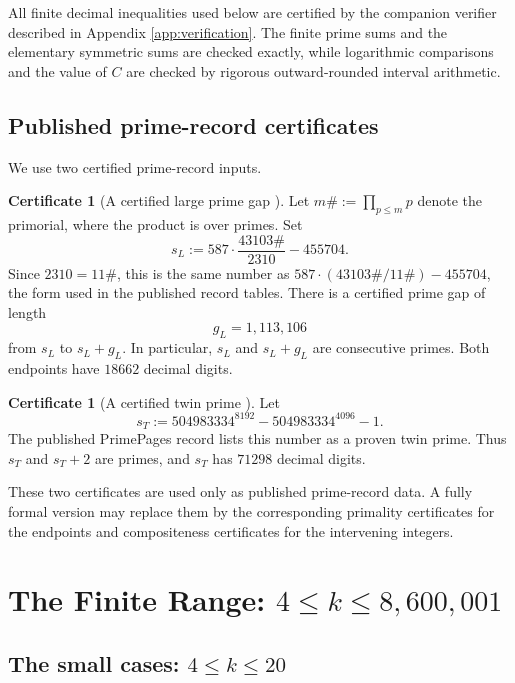 \documentclass[11pt]{article}
\numberwithin{equation}{section}
\theoremstyle{plain}
\theoremstyle{definition}
\newtheorem{certificate}[theorem]{Certificate}
\theoremstyle{remark}
\begin{document}
All finite decimal inequalities used below are certified by the companion verifier described in Appendix \ref{app:verification}.  The finite prime sums and the elementary symmetric sums are checked exactly, while logarithmic comparisons and the value of \(C\) are checked by rigorous outward-rounded interval arithmetic.

\subsection{Published prime-record certificates}

We use two certified prime-record inputs.

\begin{certificate}[A certified large prime gap \cite{PrimeRecordsGap,PrimeGapList}]\label{input:largegap}
Let \(m\#:=\prod_{p\le m}p\) denote the primorial, where the product is over primes.  Set
\[
        s_L:=587\cdot \frac{43103\#}{2310}-455704.
\]
Since \(2310=11\#\), this is the same number as \(587\cdot(43103\#/11\#)-455704\), the form used in the published record tables.  There is a certified prime gap of length
\[
        g_L=1{,}113{,}106
\]
from \(s_L\) to \(s_L+g_L\).  In particular, \(s_L\) and \(s_L+g_L\) are consecutive primes.  Both endpoints have \(18662\) decimal digits.
\end{certificate}

\begin{certificate}[A certified twin prime \cite{PrimePagesTwin,PrimePagesSpecificTwin}]\label{input:twin}
Let
\[
        s_T:=504983334^{8192}-504983334^{4096}-1.
\]
The published PrimePages record lists this number as a proven twin prime.  Thus \(s_T\) and \(s_T+2\) are primes, and \(s_T\) has \(71298\) decimal digits.
\end{certificate}

These two certificates are used only as published prime-record data.  A fully formal version may replace them by the corresponding primality certificates for the endpoints and compositeness certificates for the intervening integers.


\section{The Finite Range: \texorpdfstring{\(4\le k\le 8{,}600{,}001\)}{4 <= k <= 8,600,001}}
\label{sec:finite}

\subsection{The small cases: \texorpdfstring{\(4\le k\le20\)}{4 <= k <= 20}}
\end{document}
